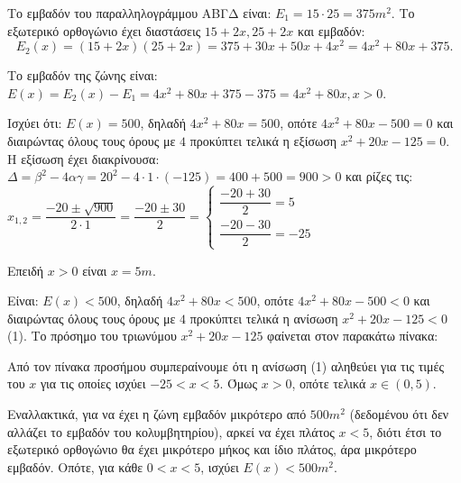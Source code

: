 
\begin{alist}
\item Το εμβαδόν του παραλληλογράμμου ΑΒΓΔ είναι: $E_1 = 15 \cdot 25 = 375 m^2$. Το εξωτερικό ορθογώνιο έχει διαστάσεις $15 + 2x, 25 + 2x$ και εμβαδόν:
\[E_2(x) = (15 + 2x)(25 + 2x) = 375 + 30x + 50x + 4x^2 = 4x^2 + 80x + 375.\]

Το εμβαδόν της ζώνης είναι: $E(x) = E_2(x) - E_1 = 4x^2 + 80x + 375 - 375 = 4x^2 + 80x, x > 0$.

\item Ισχύει ότι:
$E(x) = 500$, δηλαδή $4x^2 + 80x = 500$, οπότε $4x^2 + 80x - 500 = 0$ και διαιρώντας όλους τους όρους με $4$ προκύπτει τελικά η εξίσωση $x^2 + 20x - 125 = 0$.
Η εξίσωση έχει διακρίνουσα: $\Delta = \beta^2 - 4\alpha\gamma = 20^2 - 4 \cdot 1 \cdot (-125) = 400 + 500 = 900 > 0$
και ρίζες τις: $x_{1,2} = \dfrac{-20 \pm \sqrt{900}}{2 \cdot 1} = \dfrac{-20 \pm 30}{2} = \begin{cases} \dfrac{-20 + 30}{2} = 5 \\ \dfrac{-20 - 30}{2} = -25 \end{cases}$

Επειδή $x > 0$ είναι $x = 5m$.

\item Είναι: $E(x) < 500$, δηλαδή $4x^2 + 80x < 500$, οπότε $4x^2 + 80x - 500 < 0$ και διαιρώντας όλους τους όρους με $4$ προκύπτει τελικά η ανίσωση $x^2 + 20x - 125 < 0$ (1).
Το πρόσημο του τριωνύμου $x^2 + 20x - 125$ φαίνεται στον παρακάτω πίνακα:

\begin{center}
\end{center}

Από τον πίνακα προσήμου συμπεραίνουμε ότι η ανίσωση (1) αληθεύει για τις τιμές του $x$ για τις οποίες ισχύει $-25 < x < 5$. Όμως $x > 0$, οπότε τελικά $x \in (0, 5)$.

Εναλλακτικά, για να έχει η ζώνη εμβαδόν μικρότερο από $500m^2$ (δεδομένου ότι δεν αλλάζει το εμβαδόν του κολυμβητηρίου), αρκεί να έχει πλάτος $x < 5$, διότι έτσι το εξωτερικό ορθογώνιο θα έχει μικρότερο μήκος και ίδιο πλάτος, άρα μικρότερο εμβαδόν. Οπότε, για κάθε $0 < x < 5$, ισχύει $E(x) < 500m^2$.
\end{alist}

